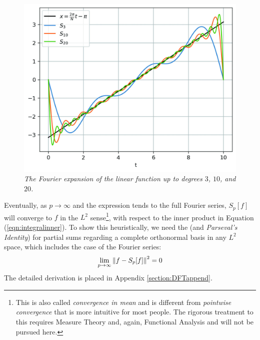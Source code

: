\begin{figure}[t!]
    \centering
    \includegraphics[scale=0.7]{graphics/fourierxapprox.jpg}
    \caption{\textit{The Fourier expansion of the linear function up to degrees $3$, $10$, and $20$.}}
    \label{fig:fourierlint}
\end{figure}
Eventually, as $p \to \infty$ and the expression tends to the full Fourier series, $S_p[f]$ will converge to $f$ in the $L^2$ sense\footnote{This is also called \textit{convergence in mean} and is different from \textit{pointwise convergence} that is more intuitive for most people. The rigorous treatment to this requires Measure Theory and, again, Functional Analysis and will not be pursued here.}, with respect to the inner product in Equation (\ref{eqn:integralinner}). To show this heuristically, we need the  (and \textit{Parseval's Identity}) for partial sums regarding a complete orthonormal basis in any $L^2$ space, which includes the case of the Fourier series:
\begin{align}
\lim_{p \to \infty}\norm{f - S_p[f]}^2 = 0
\end{align}
The detailed derivation is placed in Appendix \ref{section:DFTappend}. \par
